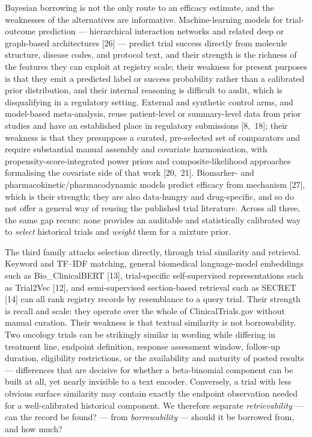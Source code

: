 \documentclass[11pt]{article}
\begin{document}
Bayesian borrowing is not the only route to an efficacy estimate, and the
weaknesses of the alternatives are informative. Machine-learning models for
trial-outcome prediction --- hierarchical interaction networks and related
deep or graph-based architectures [26] --- predict trial success directly from
molecule structure, disease codes, and protocol text, and their strength is the
richness of the features they can exploit at registry scale; their weakness for
present purposes is that they emit a predicted label or success probability
rather than a calibrated prior distribution, and their internal reasoning is
difficult to audit, which is disqualifying in a regulatory setting.
External and synthetic
control arms, and model-based meta-analysis, reuse patient-level or
summary-level data from prior studies and have an established place in
regulatory submissions [8,~18]; their weakness is that they presuppose a
curated, pre-selected set of comparators and require substantial manual
assembly and covariate harmonisation, with propensity-score-integrated power
priors and composite-likelihood approaches formalising the covariate side of
that work [20,~21]. Biomarker- and pharmacokinetic/pharmacodynamic models
predict efficacy from mechanism [27], which is their strength; they are also
data-hungry and drug-specific, and so do not offer a general way of reusing the
published trial literature.
Across all
three, the same gap recurs: none provides an auditable and statistically
calibrated way to \emph{select} historical trials and \emph{weight} them for a
mixture prior.

The third family attacks selection directly, through trial similarity and
retrieval. Keyword and TF--IDF matching, general biomedical language-model
embeddings such as Bio\_ClinicalBERT [13], trial-specific self-supervised
representations such as Trial2Vec [12], and semi-supervised section-based
retrieval such as SECRET [14] can all rank registry records by resemblance to a
query trial. Their strength is recall and scale: they operate over the whole of
ClinicalTrials.gov without manual curation. Their weakness is that textual
similarity is not borrowability. Two oncology trials can be strikingly similar
in wording while differing in treatment line, endpoint definition, response
assessment window, follow-up duration, eligibility restrictions, or the
availability and maturity of posted results --- differences that are decisive
for whether a beta-binomial component can be built at all, yet nearly invisible
to a text encoder. Conversely, a trial with less obvious surface similarity may
contain exactly the endpoint observation needed for a well-calibrated
historical component. We therefore separate \emph{retrievability} --- can the
record be found? --- from \emph{borrowability} --- should it be borrowed from,
and how much?
\end{document}
